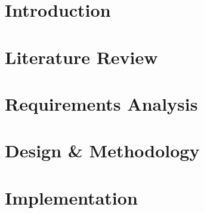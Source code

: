 \documentclass[harvard]{lincolncsthesis}
\begin{document}

\maketitle

%


\showthe\font



\thesisTables
\thesisBodyStart



\chapter{Introduction}

 
\chapter{Literature Review}


\chapter{Requirements Analysis}


\chapter{Design \& Methodology}


\chapter{Implementation}

\end{document}
